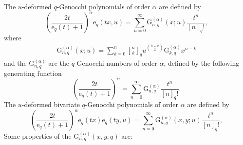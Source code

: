 \documentclass[12pt]{article}
\newcommand{\qbinom}{\genfrac{[}{]}{0pt}{}}
\newcommand{\e}{\mathrm{e}}
\newcommand{\G}{\mathrm{G}}
\begin{document}
The $u$-deformed $q$-Genocchi polynomials of order $\alpha$ are defined by
\begin{equation}
    \left(\frac{2t}{\e_{q}(t)+1}\right)^{\alpha}\e_{q}(tx,u)=\sum_{n=0}^{\infty}\G_{n,q}^{(\alpha)}(x;u)\frac{t^{n}}{[n]_{q}!},
\end{equation}
where
\begin{align}
        \G_{n,q}^{(\alpha)}(x;u)=\sum_{k=0}^{n}\qbinom{n}{k}_{q}u^{\binom{n-k}{2}}\G_{k,q}^{(\alpha)}x^{n-k}
\end{align}
and the $\G_{n,q}^{(\alpha)}$ are the $q$-Genocchi numbers of order $\alpha$, defined by the following generating function
\begin{equation}\label{eqn_qGenNum}
        \left(\frac{2t}{\e_{q}(t)+1}\right)^{\alpha}=\sum_{n=0}^{\infty}\G_{n,q}^{(\alpha)}\frac{t^n}{[n]_{q}!}.
    \end{equation}    
The $u$-deformed bivariate $q$-Genocchi polynomials of order $\alpha$ are defined by
\begin{equation}
    \left(\frac{2t}{\e_{q}(t)+1}\right)^{\alpha}\e_{q}(tx)\e_{q}(ty,u)=\sum_{n=0}^{\infty}\G_{n,q}^{(\alpha)}(x,y;u)\frac{t^{n}}{[n]_{q}!},
\end{equation}
Some properties of the $\G_{n,q}^{(\alpha)}(x,y;q)$ are:
\end{document}
